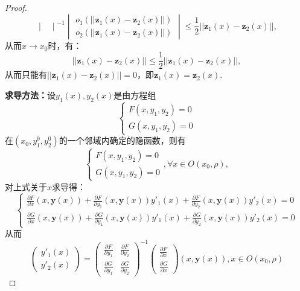 \documentclass[UTF8]{ctexart}
\begin{document}
\begin{proof}
$$\begin{vmatrix}
            \end{vmatrix}^{-1}\begin{vmatrix}
                o_1(||\boldsymbol{z}_1(x)-\boldsymbol{z}_2(x)||)\\
                o_2(||\boldsymbol{z}_1(x)-\boldsymbol{z}_2(x)||)
            \end{vmatrix}\le \frac{1}{2}||\boldsymbol{z}_1(x)-\boldsymbol{z}_2(x)||,$$
            从而$x\to x_0$时，有：
            $$||\boldsymbol{z}_1(x)-\boldsymbol{z}_2(x)||\le \frac{1}{2}||\boldsymbol{z}_1(x)-\boldsymbol{z}_2(x)||,$$
            从而只能有$||\boldsymbol{z}_1(x)-\boldsymbol{z}_2(x)||=0$，即$\boldsymbol{z}_1(x)=\boldsymbol{z}_2(x)$.
            
        \textbf{求导方法：}设$y_1(x),y_2(x)$是由方程组$$\begin{cases}
            F(x,y_1,y_2)=0\\
            G(x,y_1,y_2)=0
        \end{cases}$$在$(x_0,y_1^0,y_2^0)$的一个邻域内确定的隐函数，则有
        $$\begin{cases}
            F(x,y_1,y_2)=0\\
            G(x,y_1,y_2)=0
        \end{cases},\forall x\in O(x_0,\rho),$$
        对上式关于$x$求导得：
        $$\begin{cases}
            \frac{\partial F}{\partial x}(x,\boldsymbol{y}(x))+\frac{\partial F}{\partial y_1}(x,\boldsymbol{y}(x))y'_1(x)+\frac{\partial F}{\partial y_2}(x,\boldsymbol{y}(x))y'_2(x)=0\\
            \frac{\partial G}{\partial x}(x,\boldsymbol{y}(x))+\frac{\partial G}{\partial y_1}(x,\boldsymbol{y}(x))y'_1(x)+\frac{\partial G}{\partial y_2}(x,\boldsymbol{y}(x))y'_2(x)=0
        \end{cases}$$
        从而
        $$\begin{pmatrix}
            y'_1(x)\\
            y'_2(x)
        \end{pmatrix}=\begin{pmatrix}
                \frac{\partial F}{\partial y_1} & \frac{\partial F}{\partial y_2}\\
                \frac{\partial G}{\partial y_1} & \frac{\partial G}{\partial y_2}
            \end{pmatrix}^{-1}\begin{pmatrix}
                \frac{\partial F}{\partial x}\\
                \frac{\partial G}{\partial x}
            \end{pmatrix}(x,\boldsymbol{y}(x)),x\in O(x_0,\rho)$$
        \end{proof}
\end{document}
